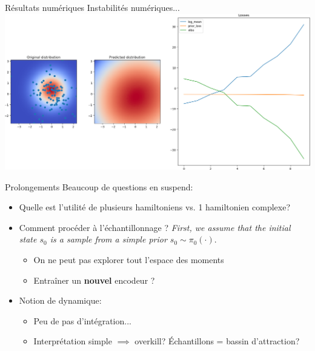 \documentclass{beamer}
\begin{document}
\begin{frame}{Résultats numériques}
Instabilités numériques...
\centering
\includegraphics[width=\linewidth]{samples/gaussian_failed.png}
\end{frame}

\begin{frame}{Prolongements}
Beaucoup de questions en suspend: 
\begin{itemize}
\item Quelle est l'utilité de plusieurs hamiltoniens vs. 1 hamiltonien complexe?
\item Comment procéder à l'échantillonnage ? \emph{First, we assume that the initial state $s_0$ is a sample from a simple prior $s_0 \sim \pi_0 (\cdot)$}.
\begin{itemize}
\item On ne peut pas explorer tout l'espace des moments
\item Entraîner un \textbf{nouvel} encodeur ?
\end{itemize}
\item Notion de dynamique: 
\begin{itemize}
\item Peu de pas d'intégration...
\item Interprétation simple $\implies$ overkill? Échantillons = bassin d'attraction?
\end{itemize}
\end{itemize}

\end{frame}
\end{document}
